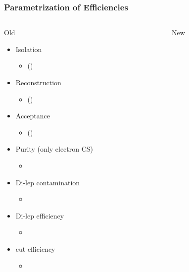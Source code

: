 \documentclass{beamer}
\begin{document}
\begin{frame}
\frametitle{Parametrization of Efficiencies}
  \begin{columns}
    \begin{column}{0.5\textwidth}
     \centering
     Old
     \begin{itemize}




        \item Isolation
   \begin{itemize}
    \item \HT \MHT \NJets (\BTags)
   \end{itemize}
   \item Reconstruction
   \begin{itemize}
    \item \HT \MHT \NJets (\BTags)
   \end{itemize}
   \item Acceptance
   \begin{itemize}
    \item \MHT \NJets (\BTags)
   \end{itemize}
   \item Purity (only electron CS)
   \begin{itemize}
    \item \MHT \NJets
   \end{itemize}
      \item Di-lep contamination
   \begin{itemize}
    \item \MHT \NJets
   \end{itemize}
   \item Di-lep efficiency
   \begin{itemize}
    \item \NJets
   \end{itemize}
   \item \mt cut efficiency
   \begin{itemize}
    \item \NJets
   \end{itemize}
     \end{itemize}
    \end{column}
    \begin{column}{0.5\textwidth}
      \centering
      New
             \begin{itemize}



\end{itemize}
\end{column}
\end{columns}
\end{frame}
\end{document}
